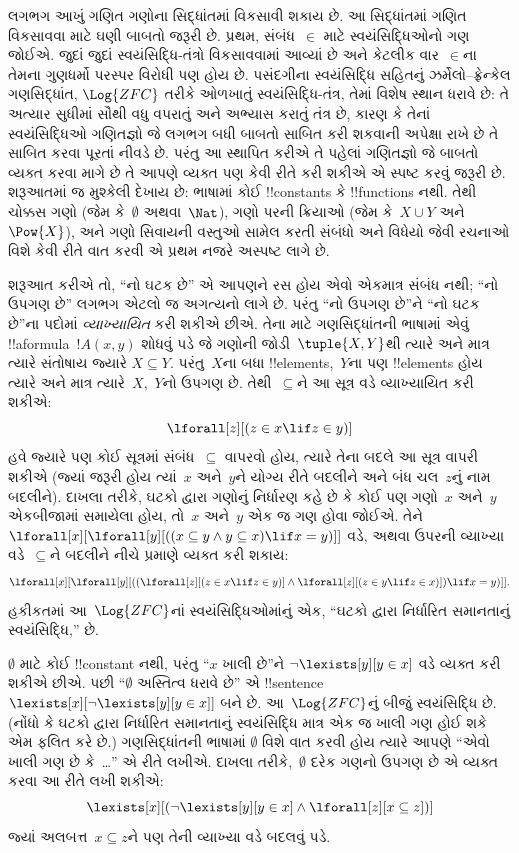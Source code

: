 \documentclass[../../../include/open-logic-section]{subfiles}
\begin{document}


લગભગ આખું ગણિત ગણોના સિદ્ધાંતમાં વિકસાવી શકાય છે. આ સિદ્ધાંતમાં
ગણિત વિકસાવવા માટે ઘણી બાબતો જરૂરી છે. પ્રથમ, સંબંધ~$\in$ માટે
સ્વયંસિદ્ધિઓનો ગણ જોઈએ. જુદાં જુદાં સ્વયંસિદ્ધિ-તંત્રો વિકસાવવામાં
આવ્યાં છે અને કેટલીક વાર~$\in$ના તેમના ગુણધર્મો પરસ્પર વિરોધી પણ હોય
છે. પસંદગીના સ્વયંસિદ્ધિ સહિતનું ઝર્મેલો--ફ્રેન્કેલ ગણસિદ્ધાંત,
$\Log{ZFC}$ તરીકે ઓળખાતું સ્વયંસિદ્ધિ-તંત્ર, તેમાં વિશેષ સ્થાન ધરાવે
છે: તે અત્યાર સુધીમાં સૌથી વધુ વપરાતું અને અભ્યાસ કરાતું તંત્ર છે,
કારણ કે તેનાં સ્વયંસિદ્ધિઓ ગણિતજ્ઞો જે લગભગ બધી બાબતો સાબિત કરી શકવાની
અપેક્ષા રાખે છે તે સાબિત કરવા પૂરતાં નીવડે છે. પરંતુ આ સ્થાપિત કરીએ તે
પહેલાં ગણિતજ્ઞો જે બાબતો વ્યક્ત કરવા માગે છે તે આપણે વ્યક્ત પણ કેવી
રીતે કરી શકીએ એ સ્પષ્ટ કરવું જરૂરી છે. શરૂઆતમાં જ મુશ્કેલી દેખાય છે:
ભાષામાં કોઈ !!{constant}s કે !!{function}s નથી. તેથી ચોક્કસ ગણો (જેમ
કે~$\emptyset$ અથવા~$\Nat$), ગણો પરની ક્રિયાઓ (જેમ કે~$X\cup Y$ અને
$\Pow{X}$), અને ગણો સિવાયની વસ્તુઓ સામેલ કરતી સંબંધો અને વિધેયો જેવી
રચનાઓ વિશે કેવી રીતે વાત કરવી એ પ્રથમ નજરે અસ્પષ્ટ લાગે છે.

શરૂઆત કરીએ તો, ``નો ઘટક છે'' એ આપણને રસ હોય એવો એકમાત્ર સંબંધ નથી;
``નો ઉપગણ છે'' લગભગ એટલો જ અગત્યનો લાગે છે. પરંતુ ``નો ઉપગણ છે''ને
``નો ઘટક છે''ના પદોમાં \emph{વ્યાખ્યાયિત} કરી શકીએ છીએ. તેના માટે
ગણસિદ્ધાંતની ભાષામાં એવું !!a{formula}~$!A(x,y)$ શોધવું પડે જે ગણોની
જોડી~$\tuple{X,Y}$થી ત્યારે અને માત્ર ત્યારે સંતોષાય જ્યારે
$X\subseteq Y$. પરંતુ~$X$ના બધા !!{element}s,~$Y$ના પણ !!{element}s
હોય ત્યારે અને માત્ર ત્યારે~$X$,~$Y$નો ઉપગણ છે. તેથી~$\subseteq$ને આ
સૂત્ર વડે વ્યાખ્યાયિત કરી શકીએ:
\[
\lforall[z][(z \in x \lif z \in y)]
\]
હવે જ્યારે પણ કોઈ સૂત્રમાં સંબંધ~$\subseteq$ વાપરવો હોય, ત્યારે તેના
બદલે આ સૂત્ર વાપરી શકીએ (જ્યાં જરૂરી હોય ત્યાં~$x$ અને~$y$ને યોગ્ય
રીતે બદલીને અને બંધ ચલ~$z$નું નામ બદલીને). દાખલા તરીકે, ઘટકો દ્વારા
ગણોનું નિર્ધારણ કહે છે કે કોઈ પણ ગણો~$x$ અને~$y$ એકબીજામાં સમાયેલા
હોય, તો~$x$ અને~$y$ એક જ ગણ હોવા જોઈએ. તેને
$\lforall[x][\lforall[y][((x\subseteq y\land y\subseteq x)\lif x=y)]]$
વડે, અથવા ઉપરની વ્યાખ્યા વડે~$\subseteq$ને બદલીને નીચે પ્રમાણે વ્યક્ત
કરી શકાય:
\[
\lforall[x][\lforall[y][((\lforall[z][(z \in x \lif z \in y)] \land
    \lforall[z][(z \in y \lif z \in x)]) \lif x = y)]].
\]
હકીકતમાં આ~$\Log{ZFC}$નાં સ્વયંસિદ્ધિઓમાંનું એક, ``ઘટકો દ્વારા
નિર્ધારિત સમાનતાનું સ્વયંસિદ્ધિ,'' છે.

$\emptyset$ માટે કોઈ !!{constant} નથી, પરંતુ ``$x$ ખાલી છે''ને
$\lnot\lexists[y][y\in x]$ વડે વ્યક્ત કરી શકીએ છીએ. પછી
``$\emptyset$ અસ્તિત્વ ધરાવે છે'' એ !!{sentence}
$\lexists[x][\lnot\lexists[y][y\in x]]$ બને છે. આ~$\Log{ZFC}$નું બીજું
સ્વયંસિદ્ધિ છે. (નોંધો કે ઘટકો દ્વારા નિર્ધારિત સમાનતાનું સ્વયંસિદ્ધિ
માત્ર એક જ ખાલી ગણ હોઈ શકે એમ ફલિત કરે છે.) ગણસિદ્ધાંતની ભાષામાં
$\emptyset$ વિશે વાત કરવી હોય ત્યારે આપણે ``એવો ખાલી ગણ છે કે~\dots''
એ રીતે લખીએ. દાખલા તરીકે,~$\emptyset$ દરેક ગણનો ઉપગણ છે એ વ્યક્ત કરવા
આ રીતે લખી શકીએ:
\[
\lexists[x][(\lnot\lexists[y][y \in x] \land \lforall[z][x \subseteq
    z])]
\]
જ્યાં અલબત્ત~$x\subseteq z$ને પણ તેની વ્યાખ્યા વડે બદલવું પડે.
\end{document}

